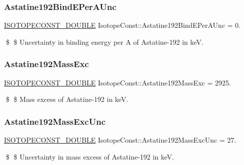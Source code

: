 \subsubsection{\texorpdfstring{Astatine192\+Bind\+E\+Per\+A\+Unc}{Astatine192BindEPerAUnc}}
{\footnotesize\ttfamily \mbox{\hyperlink{group___isotope_const-_macros_ga8f45a7272ce02c0b4c65c44636ed719a}{I\+S\+O\+T\+O\+P\+E\+C\+O\+N\+S\+T\+\_\+\+D\+O\+U\+B\+LE}} Isotope\+Const\+::\+Astatine192\+Bind\+E\+Per\+A\+Unc = 0.}

\$ \$ Uncertainty in binding energy per A of Astatine-\/192 in keV. \mbox{\label{group___isotope_const-_astatine-_at192_ga4d2203a4685fb54bf816872d997e9677}} 
\subsubsection{\texorpdfstring{Astatine192\+Mass\+Exc}{Astatine192MassExc}}
{\footnotesize\ttfamily \mbox{\hyperlink{group___isotope_const-_macros_ga8f45a7272ce02c0b4c65c44636ed719a}{I\+S\+O\+T\+O\+P\+E\+C\+O\+N\+S\+T\+\_\+\+D\+O\+U\+B\+LE}} Isotope\+Const\+::\+Astatine192\+Mass\+Exc = 2925.}

\$ \$ Mass excess of Astatine-\/192 in keV. \mbox{\label{group___isotope_const-_astatine-_at192_ga68a9147926e025c6de60323b36f55998}} 
\subsubsection{\texorpdfstring{Astatine192\+Mass\+Exc\+Unc}{Astatine192MassExcUnc}}
{\footnotesize\ttfamily \mbox{\hyperlink{group___isotope_const-_macros_ga8f45a7272ce02c0b4c65c44636ed719a}{I\+S\+O\+T\+O\+P\+E\+C\+O\+N\+S\+T\+\_\+\+D\+O\+U\+B\+LE}} Isotope\+Const\+::\+Astatine192\+Mass\+Exc\+Unc = 27.}

\$ \$ Uncertainty in mass excess of Astatine-\/192 in keV. \mbox{\label{group___isotope_const-_astatine-_at192_ga120543c024221b772c65a693121fe3b9}} 
